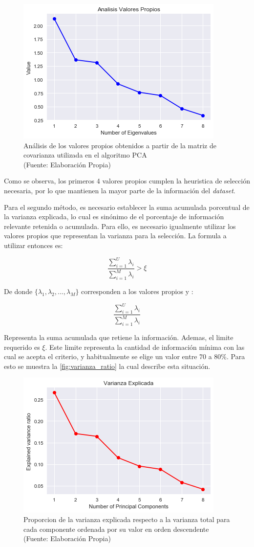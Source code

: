 \begin{figure}[ht!]
\centering
\includegraphics[width=.6\textwidth]{figures/eigenvalues.png}
\caption[abs]{Análisis de los valores propios obtenidos a partir de la matriz de covarianza utilizada en el algoritmo PCA  \\
{\scriptsize (Fuente: Elaboración Propia)}}
\label{fig:manifold}
\end{figure}

Como se observa, los primeros 4 valores propios cumplen la heuristica de selección necesaria, por lo que mantienen la mayor parte de la información del \textit{dataset}.

Para el segundo método, es necesario establecer la suma acumulada porcentual de la varianza explicada, lo cual es sinónimo de el porcentaje de información relevante retenida o acumulada. Para ello, es necesario igualmente utilizar los valores propios que representan la varianza para la selección. La formula a utilizar entonces es:

$$ \frac{\sum_{i=1}^{U}\lambda_{i}}{\sum_{i=1}^{M}\lambda_{i}}  > \xi $$

De donde $\{ \lambda_{1}, \lambda_{2}, ..., \lambda_{M}\}$ corresponden a los valores propios y :

$$\frac{\sum_{i=1}^{U}\lambda_{i}}{\sum_{i=1}^{M}\lambda_{i}}$$

Representa la suma acumulada que retiene la información. Ademas, el limite requerido es $\xi$. Este limite representa la cantidad de información mínima con las cual se acepta el criterio, y habitualmente se elige un valor entre 70 a 80\%. Para esto se muestra la  \autoref{fig:varianza_ratio} la cual describe esta situación.

\begin{figure}[ht!]
\centering
\includegraphics[width=.6\textwidth]{figures/varianza_ratio.png}
\caption[abs]{Proporcion de la varianza explicada respecto a la varianza total para cada componente ordenada por su valor en orden descendente  \\
{\scriptsize (Fuente: Elaboración Propia)}}
\label{fig:varianza_ratio}
\end{figure}

